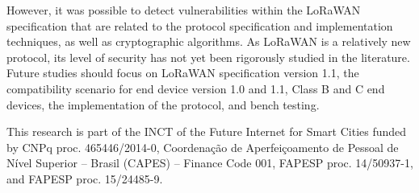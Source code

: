 \documentclass[manuscript,screen,review=false]{acmart}
\begin{document}
However, it was possible to detect vulnerabilities within the LoRaWAN specification that are related to the protocol specification and implementation techniques, as well as cryptographic algorithms. As LoRaWAN is a relatively new protocol, its level of security has not yet been rigorously studied in the literature. Future studies should focus on LoRaWAN specification version 1.1, the compatibility scenario for end device version 1.0 and 1.1, Class B and C end devices, the implementation of the protocol, and bench testing.

\begin{acks}
This research is part of the INCT of the Future Internet for Smart Cities funded by CNPq proc. 465446/2014-0, Coordenação de Aperfeiçoamento de Pessoal de Nível Superior – Brasil (CAPES) – Finance Code 001, FAPESP proc. 14/50937-1, and FAPESP proc. 15/24485-9.
\end{acks}

%


\end{document}
